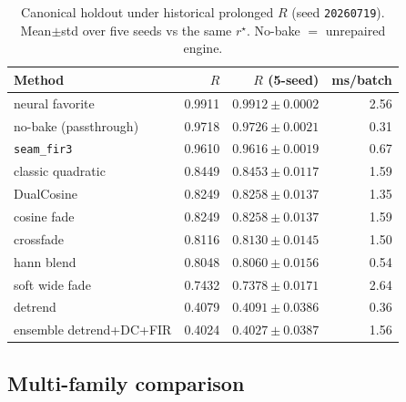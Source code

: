 \begin{table}[t]
  \centering
  \caption{Canonical holdout under historical prolonged $R$ (seed \texttt{20260719}). Mean$\pm$std over five seeds vs the same $r^{\star}$. No-bake $=$ unrepaired engine.}
  \label{tab:canonical-methods}
  \setlength{\tabcolsep}{3pt}
  \begin{tabular}{@{}lrrr@{}}
    \toprule
    Method & $R$ & $R$ (5-seed) & ms/batch \\
    \midrule
    neural favorite & 0.9911 & $0.9912\pm0.0002$ & 2.56 \\
    no-bake (passthrough) & 0.9718 & $0.9726\pm0.0021$ & 0.31 \\
    \texttt{seam\_fir3} & 0.9610 & $0.9616\pm0.0019$ & 0.67 \\
    classic quadratic & 0.8449 & $0.8453\pm0.0117$ & 1.59 \\
    DualCosine & 0.8249 & $0.8258\pm0.0137$ & 1.35 \\
    cosine fade & 0.8249 & $0.8258\pm0.0137$ & 1.59 \\
    crossfade & 0.8116 & $0.8130\pm0.0145$ & 1.50 \\
    hann blend & 0.8048 & $0.8060\pm0.0156$ & 0.54 \\
    soft wide fade & 0.7432 & $0.7378\pm0.0171$ & 2.64 \\
    detrend & 0.4079 & $0.4091\pm0.0386$ & 0.36 \\
    ensemble detrend{+}DC{+}FIR & 0.4024 & $0.4027\pm0.0387$ & 1.56 \\
    \bottomrule
  \end{tabular}
\end{table}

\subsection{Multi-family comparison}
\label{sec:sota-main}

